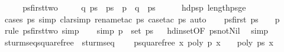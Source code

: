 \begin{isabellebody}
\isadelimproof
\ %
\endisadelimproof
%
\isatagproof
\isacommand{{\isachardot}{\isachardot}}\isamarkupfalse%
%
\endisatagproof
{\isafoldproof}%
%
\isadelimproof
%
\endisadelimproof
\isanewline
\isanewline
\ \ \isamarkupfalse%
\ ps{\isacharunderscore}first{\isacharunderscore}two{\isacharcolon}\isanewline
\ \ \ \ \ q\ ps{\isacharprime}\ \ {\isachardoublequoteopen}ps\ {\isacharequal}\ p\ {\isacharhash}\ q\ {\isacharhash}\ ps{\isacharprime}{\isachardoublequoteclose}\isanewline
%
\isadelimproof
\ \ \ \ %
\endisadelimproof
%
\isatagproof
{}\isamarkupfalse%
\ hd{\isacharunderscore}ps{\isacharunderscore}p\ length{\isacharunderscore}ps{\isacharunderscore}ge{\isacharunderscore}{}\isanewline
\ \ \ \ \ \ \isamarkupfalse%
\ {\isacharparenleft}cases\ ps{\isacharcomma}\ simp{\isacharcomma}\ clarsimp{\isacharcomma}\ rename{\isacharunderscore}tac\ ps{\isacharprime}{\isacharcomma}\ case{\isacharunderscore}tac\ ps{\isacharprime}{\isacharcomma}\ auto{\isacharparenright}%
\endisatagproof
{\isafoldproof}%
%
\isadelimproof
\isanewline
%
\endisadelimproof
\isanewline
\ \ \isamarkupfalse%
\ ps{\isacharunderscore}first{\isacharcolon}\ {\isachardoublequoteopen}ps\ {\isacharbang}\ {}\ {\isacharequal}\ p{\isachardoublequoteclose}%
\isadelimproof
\ %
\endisadelimproof
%
\isatagproof
{}\isamarkupfalse%
\ {\isacharparenleft}rule\ ps{\isacharunderscore}first{\isacharunderscore}two{\isacharcomma}\ simp{\isacharparenright}%
\endisatagproof
{\isafoldproof}%
%
\isadelimproof
%
\endisadelimproof
\isanewline
\isanewline
\ \ \isamarkupfalse%
\ {\isacharbrackleft}simp{\isacharbrackright}{\isacharcolon}\ {\isachardoublequoteopen}p\ {\isasymin}\ set\ ps{\isachardoublequoteclose}%
\isadelimproof
\ %
\endisadelimproof
%
\isatagproof
{}\isamarkupfalse%
\ hd{\isacharunderscore}in{\isacharunderscore}set{\isacharbrackleft}OF\ ps{\isacharunderscore}not{\isacharunderscore}Nil{\isacharbrackright}\ \isamarkupfalse%
\ simp%
\endisatagproof
{\isafoldproof}%
%
\isadelimproof
%
\endisadelimproof
\isanewline
\isanewline
{}\isamarkupfalse%
\isanewline
\isanewline
{}\isamarkupfalse%
\ sturm{\isacharunderscore}seq{\isacharunderscore}squarefree\ {\isacharequal}\ sturm{\isacharunderscore}seq\ {\isacharplus}\isanewline
\ \ \ p{\isacharunderscore}squarefree{\isacharcolon}\ {\isachardoublequoteopen}{\isasymAnd}x{\isachardot}\ {\isasymnot}{\isacharparenleft}poly\ p\ x\ {\isacharequal}\ {}\ {\isasymand}\ poly\ {\isacharparenleft}ps{\isacharbang}{}{\isacharparenright}\ x\ {\isacharequal}\ {}{\isacharparenright}{\isachardoublequoteclose}\isanewline

\end{isabellebody}
